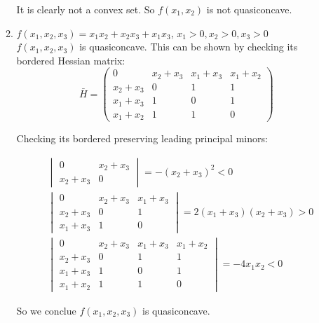 \documentclass{article}
\begin{document}
\begin{enumerate}
\begin{enumerate}
            It is clearly not a convex set. So $f(x_1,x_2)$ is not quasiconcave. \\
            
            \item $f(x_1,x_2,x_3)=x_1x_2 + x_2x_3 + x_1x_3$, $x_1>0, x_2>0, x_3>0$ \\
            
            $f(x_1,x_2,x_3)$ is quasiconcave. This can be shown by checking its bordered Hessian matrix:
            \[
                \bar{H} = \begin{pmatrix}
                0 & x_2+x_3 & x_1+x_3 & x_1+x_2 \\
                x_2+x_3 & 0 & 1 & 1 \\
                x_1+x_3 & 1 & 0 & 1 \\
                x_1+x_2 & 1 & 1 & 0
                \end{pmatrix}
            \]
            
            Checking its bordered preserving leading principal minors: 
        
            \begin{align*}
               &\begin{vmatrix}
                0 & x_2+x_3 \\
                x_2+x_3 & 0 
                \end{vmatrix}
                = - (x_2+x_3)^2 < 0 \\     
              &\begin{vmatrix}
                0 & x_2+x_3 & x_1+x_3 \\
                x_2+x_3 & 0 & 1  \\
                x_1+x_3 & 1 & 0  
                \end{vmatrix}
                = 2 (x_1+x_3)(x_2+x_3) > 0 \\
              &\begin{vmatrix}
                0 & x_2+x_3 & x_1+x_3 & x_1+x_2 \\
                x_2+x_3 & 0 & 1 & 1 \\
                x_1+x_3 & 1 & 0 & 1 \\
                x_1+x_2 & 1 & 1 & 0
                \end{vmatrix}
                = - 4x_1x_2 < 0
            \end{align*}
            
            So we conclue $f(x_1,x_2,x_3)$ is quasiconcave. \\ 
            

\end{enumerate}
\end{enumerate}
\end{document}
